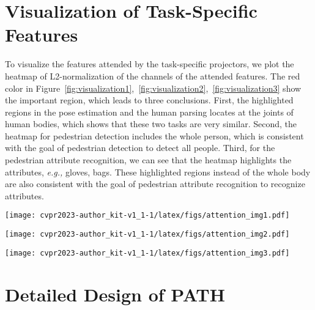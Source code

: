 \documentclass[10pt,twocolumn,letterpaper]{article}
\begin{document}
\section{Visualization of Task-Specific Features}
To visualize the features attended by the task-specific projectors, we plot the heatmap of L2-normalization of the channels of the attended features. The red color in Figure~\ref{fig:visualization1},~\ref{fig:visualization2},~\ref{fig:visualization3} show the important region, which leads to three conclusions. First, the highlighted regions in the pose estimation and the human parsing locates at the joints of human bodies, which shows that these two tasks are very similar. Second, the heatmap for pedestrian detection includes the whole person, which is consistent with the goal of pedestrian detection to detect all people. Third, for the pedestrian attribute recognition, we can see that the heatmap highlights the attributes, \emph{e.g.,} gloves, bags. These highlighted regions instead of the whole body are also consistent with the goal of pedestrian attribute recognition to recognize attributes.



\begin{figure*}
    \centering
    \texttt{[image: cvpr2023-author\_kit-v1\_1-1/latex/figs/attention\_img1.pdf]}
    \caption{Visualization of features after the task-specific projectors}
    \label{fig:visualization1}
\end{figure*}

\begin{figure*}
    \centering
    \texttt{[image: cvpr2023-author\_kit-v1\_1-1/latex/figs/attention\_img2.pdf]}
    \caption{Visualization of features after the task-specific projectors}
    \label{fig:visualization2}
\end{figure*}

\begin{figure*}
    \centering
    \texttt{[image: cvpr2023-author\_kit-v1\_1-1/latex/figs/attention\_img3.pdf]}
    \caption{Visualization of features after the task-specific projectors}
    \label{fig:visualization3}
\end{figure*}


\section{Detailed Design of PATH}
\end{document}
